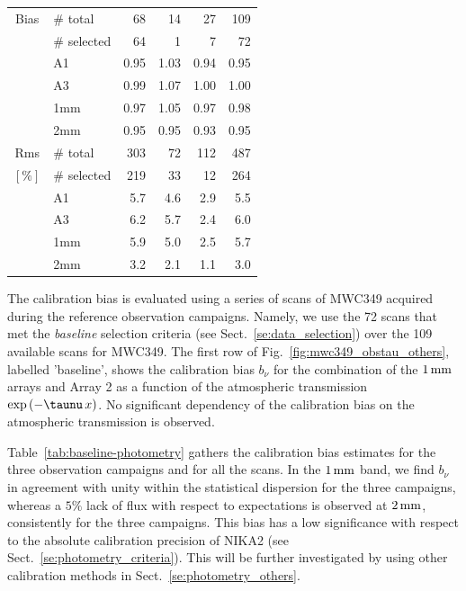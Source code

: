 \begin{table}[!thbp]
\begin{center}
\begin{tabular}{clrrrr}
  Bias &  $\#$ total    &  68    &  14     &   27     &    109    \\
       &  $\#$ selected &  64    &   1     &   7      &     72    \\
       &  A1            &  0.95  &  1.03   &   0.94   &   0.95    \\
       &  A3            &  0.99  &  1.07   &   1.00   &   1.00    \\
       &  1mm           &  0.97  &  1.05   &   0.97   &   0.98    \\
       &  2mm           &  0.95  &  0.95   &   0.93   &   0.95    \\
  \hline
  \noalign{\smallskip}
  Rms  &  $\#$ total    &  303   &  72     &   112    &    487   \\
  $[\%]$ &  $\#$ selected &  219   &  33     &    12    &    264   \\
       &  A1            &  5.7   &  4.6    &   2.9    &    5.5   \\
       &  A3            &  6.2   &  5.7    &   2.4    &    6.0   \\
       &  1mm           &  5.9   &  5.0    &   2.5    &    5.7   \\
       &  2mm           &  3.2   &  2.1    &   1.1    &    3.0   \\  
\hline
\end{tabular}
\end{center}
\end{table}

The calibration bias is evaluated using a
series of scans of MWC349 acquired during the
 reference observation campaigns. Namely, we use the 72 scans that met
 the \emph{baseline} selection
 criteria (see Sect.~\ref{se:data_selection}) over the 109 available
scans for MWC349. The first row of
Fig.~\ref{fig:mwc349_obstau_others}, labelled 'baseline', shows the
calibration bias $b_{\nu}$ for the combination of the $1\,\rm{mm}$ arrays and
Array 2 as a function of the atmospheric transmission %
$\exp \left( - \taunu \, x \right)$. No significant dependency of the
calibration bias on the atmospheric transmission is observed. 

Table~\ref{tab:baseline-photometry} gathers the calibration bias
estimates for the three observation campaigns and for all the scans.
In the $1\,\rm{mm}$ band, we find
$b_\nu$ in agreement with unity within the statistical dispersion for
the three campaigns,
whereas a $5\%$ lack of flux with respect to expectations is observed
at $2\,\rm{mm}$, consistently for the three campaigns. This bias has a
low significance with respect to the absolute calibration precision of
NIKA2 (see Sect.~\ref{se:photometry_criteria}).
This will be further investigated by using other calibration methods
in Sect.~\ref{se:photometry_others}.


